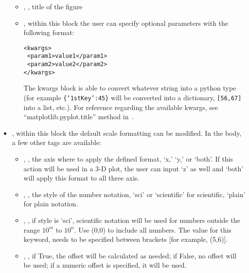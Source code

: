 \begin{itemize}
  \begin{itemize}
    \item {}, , title of the figure
    \item {}, within this block the user can specify optional parameters
    with the following format:

\begin{lstlisting}[style=XML]
<kwargs>
 <param1>value1</param1>
 <param2>value2</param2>
</kwargs>
\end{lstlisting}

  The kwargs block is able to convert whatever string into a python type (for
  example \texttt{\{`1stKey':45\}} will
  be converted into a dictionary,
  \texttt{[56,67]} into a list, etc.).
    For reference regarding the available kwargs, see
    ``matplotlib.pyplot.title'' method in~\cite{MatPlotLib}.
  \end{itemize}
  \item {}, within this block the default scale formatting
  can be modified.
  In the body, a few other tags are available:
 \begin{itemize}
    \item {}, , the axis where to apply the defined
    format, `x,' `y,' or `both'.
    \nb If this action will be used in a 3-D plot, the user can input `z' as
    well and `both' will apply this format to all three axis.
    \item {}, , the style of the number notation,
    `sci' or `scientific' for scientific, `plain' for plain notation.
    \item {}, , if
    style is `sci', scientific notation will be used for numbers outside the
    range $10^m$ to $10^n$.
    Use (0,0) to include all numbers.
    \nb The value for this keyword, needs to be specified between brackets [for
    example, (5,6)].
    \item {}, , if True, the offset
    will be calculated as needed; if False, no offset will be used; if a numeric
    offset is specified, it will be used.
  \end{itemize}

\end{itemize}
